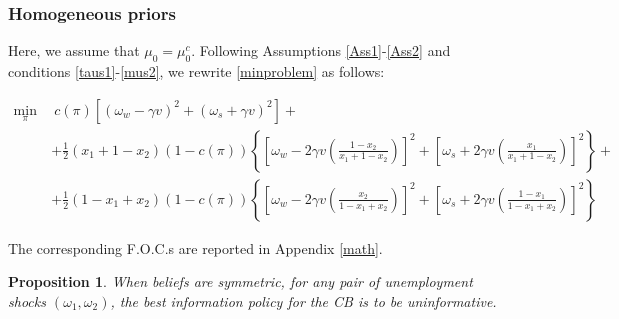 \documentclass[12pt,a4paper]{article}
\newtheorem{proposition}{Proposition}
\begin{document}
\subsubsection{Homogeneous priors}

Here, we assume that $\mu_0=\mu_0^c$. Following Assumptions \ref{Ass1}-\ref{Ass2} and conditions \eqref{taus1}-\eqref{mus2}, we rewrite \eqref{minproblem} as follows:
\begin{small}
    \begin{equation}
    \begin{split}
    \min_{\pi} \ & \ c(\pi)\left[(\omega_w-\gamma v)^2+(\omega_s+\gamma v)^2\right]+\\
     &  +\frac{1}{2}(x_1 + 1-x_2)(1-c(\pi))\left\{\left[\omega_w-2\gamma v\left(\frac{1-x_2}{x_1+1-x_2}\right)\right]^2+\left[\omega_s+2\gamma v\left(\frac{x_1}{x_1+1-x_2}\right)\right]^2\right\}+ \\
     & +\frac{1}{2}(1-x_1 + x_2)(1-c(\pi))\left\{\left[\omega_w-2\gamma v\left(\frac{x_2}{1-x_1+x_2}\right)\right]^2+\left[\omega_s+2\gamma v\left(\frac{1-x_1}{1-x_1+x_2}\right)\right]^2\right\}
    \end{split}
    \end{equation}
\end{small}
The corresponding F.O.C.s are reported in Appendix \ref{math}.

\begin{proposition}
    When beliefs are symmetric, for any pair of unemployment shocks $(\omega_1,\omega_2)$, the best information policy for the CB is to be uninformative.
\end{proposition}
\end{document}
